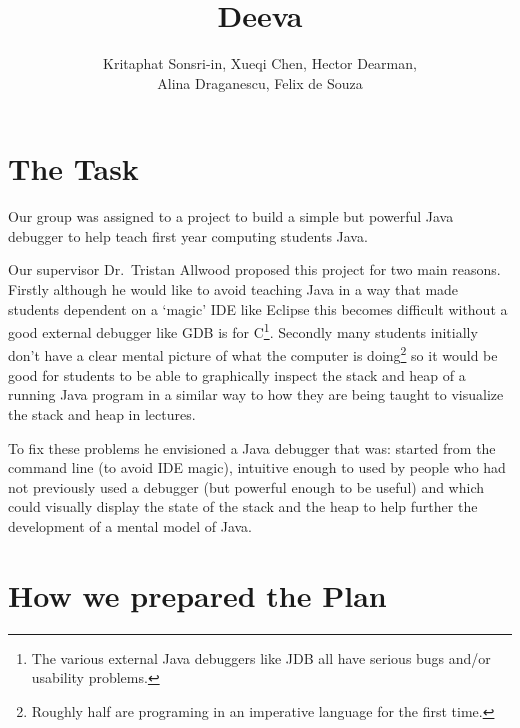 \documentclass[11pt, a4paper]{article}
\newcommand{\subtitle}[1]{
  \posttitle{
    \par\end{center}
    \begin{center}\large#1\end{center}
    \vskip0.5em}
}
\begin{document}
\title{Deeva}
\subtitle{Planning Report}
\author{Kritaphat Sonsri-in, Xueqi Chen, Hector Dearman, \\Alina Draganescu, Felix de Souza}

\maketitle

\section{The Task}
Our group was assigned to a project to build a simple but powerful Java debugger to help teach first year computing students Java.

Our supervisor Dr.~Tristan Allwood proposed this project for two main reasons.
Firstly although he would like to avoid teaching Java in a way that made students dependent on a `magic' IDE like Eclipse this becomes difficult without a good external debugger like GDB is for C\footnote{The various external Java debuggers like JDB all have serious bugs and/or usability problems.}.
Secondly many students initially don't have a clear mental picture of what the computer is doing\footnote{Roughly half are programing in an imperative language for the first time.} so it would be good for students to be able to graphically inspect the stack and heap of a running Java program in a similar way to how they are being taught to visualize the stack and heap in lectures.

To fix these problems he envisioned a Java debugger that was: started from the command line (to avoid IDE magic), intuitive enough to used by people who had not previously used a debugger (but powerful enough to be useful) and which could visually display the state of the stack and the heap to help further the development of a mental model of Java.


\section{How we prepared the Plan}
\end{document}
